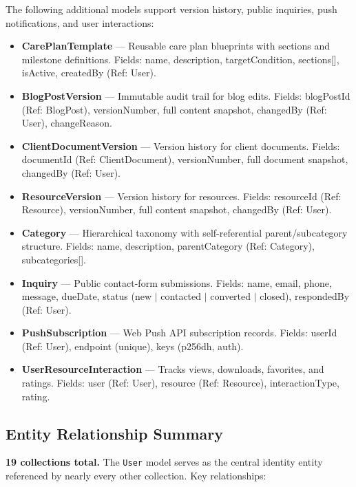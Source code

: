 \documentclass[12pt,letterpaper]{article}
\begin{document}
The following additional models support version history, public inquiries, push notifications, and user interactions:

\begin{itemize}[nosep]
  \item \textbf{CarePlanTemplate} --- Reusable care plan blueprints with sections and milestone definitions. Fields: name, description, targetCondition, sections[], isActive, createdBy (Ref: User).
  \item \textbf{BlogPostVersion} --- Immutable audit trail for blog edits. Fields: blogPostId (Ref: BlogPost), versionNumber, full content snapshot, changedBy (Ref: User), changeReason.
  \item \textbf{ClientDocumentVersion} --- Version history for client documents. Fields: documentId (Ref: ClientDocument), versionNumber, full document snapshot, changedBy (Ref: User).
  \item \textbf{ResourceVersion} --- Version history for resources. Fields: resourceId (Ref: Resource), versionNumber, full content snapshot, changedBy (Ref: User).
  \item \textbf{Category} --- Hierarchical taxonomy with self-referential parent/subcategory structure. Fields: name, description, parentCategory (Ref: Category), subcategories[].
  \item \textbf{Inquiry} --- Public contact-form submissions. Fields: name, email, phone, message, dueDate, status (new $\vert$ contacted $\vert$ converted $\vert$ closed), respondedBy (Ref: User).
  \item \textbf{PushSubscription} --- Web Push API subscription records. Fields: userId (Ref: User), endpoint (unique), keys (p256dh, auth).
  \item \textbf{UserResourceInteraction} --- Tracks views, downloads, favorites, and ratings. Fields: user (Ref: User), resource (Ref: Resource), interactionType, rating.
\end{itemize}

\subsection{Entity Relationship Summary}

\textbf{19 collections total.} The \texttt{User} model serves as the central identity entity referenced by nearly every other collection. Key relationships:
\end{document}
